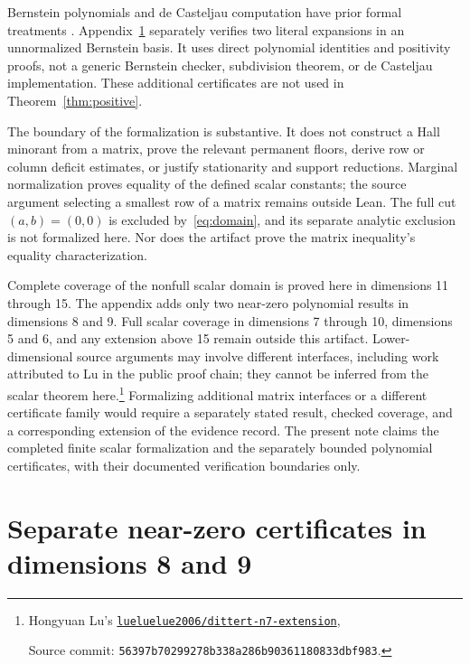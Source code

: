 \documentclass[11pt]{article}
\begin{document}
Bernstein polynomials and de Casteljau computation have prior formal
treatments \cite{bertot2011formal,munoz2012formalization}.
Appendix~\ref{app:nearzero} separately verifies two literal expansions
in an unnormalized Bernstein basis. It uses direct polynomial identities
and positivity proofs, not a generic Bernstein checker, subdivision
theorem, or de Casteljau implementation. These additional certificates
are not used in Theorem~\ref{thm:positive}.

The boundary of the formalization is substantive. It does not construct
a Hall minorant from a matrix, prove the relevant permanent floors,
derive row or column deficit estimates, or justify stationarity and
support reductions. Marginal normalization proves equality of the
defined scalar constants; the source argument selecting a smallest row
of a matrix remains outside Lean. The full cut $(a,b)=(0,0)$ is excluded
by~\eqref{eq:domain}, and its separate analytic exclusion is not
formalized here. Nor does the artifact prove the matrix inequality's
equality characterization.

Complete coverage of the nonfull scalar domain is proved here in dimensions
11 through 15. The appendix adds only two near-zero polynomial results
in dimensions 8 and 9. Full scalar coverage in dimensions 7 through 10,
dimensions 5 and 6, and any extension above 15 remain outside
this artifact. Lower-dimensional source arguments may involve different
interfaces, including work attributed to Lu in the public proof chain;
they cannot be inferred from the scalar theorem here.\footnote{\raggedright Hongyuan
Lu's \href{https://github.com/lueluelue2006/dittert-n7-extension/tree/56397b70299278b338a286b90361180833dbf983}{\texttt{lueluelue2006/dittert-n7-extension}},
\par\noindent Source commit: \nolinkurl{56397b70299278b338a286b90361180833dbf983}.}
Formalizing additional matrix interfaces or a different certificate
family would require a separately stated result, checked coverage, and
a corresponding extension of the evidence record. The present note
claims the completed finite scalar formalization and the separately
bounded polynomial certificates, with their documented verification
boundaries only.

\appendix
\section{Separate near-zero certificates in dimensions 8 and 9}
\label{app:nearzero}
\end{document}

